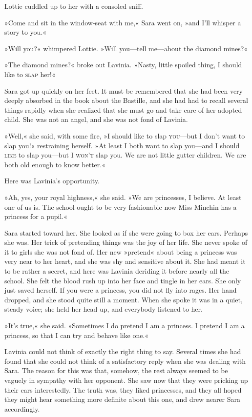 Lottie cuddled up to her with a consoled sniff.

»Come and sit in the window-seat with me,« Sara went on, »and I'll whisper a story to you.«

»Will you?« whimpered Lottie. »Will you—tell me—about the diamond mines?«

»The diamond mines?« broke out Lavinia. »Nasty, little spoiled thing, I should like to \textsc{slap} her!«

Sara got up quickly on her feet. It must be remembered that she had been very deeply absorbed in the book about the Bastille, and she had had to recall several things rapidly when she realized that she must go and take care of her adopted child. She was not an angel, and she was not fond of Lavinia.

»Well,« she said, with some fire, »I should like to slap \textsc{you}—but I don't want to slap you!« restraining herself. »At least I both want to slap you—and I should \textsc{like} to slap you—but I \textsc{won't} slap you. We are not little gutter children. We are both old enough to know better.«

Here was Lavinia's opportunity.

»Ah, yes, your royal highness,« she said. »We are princesses, I believe. At least one of us is. The school ought to be very fashionable now Miss Minchin has a princess for a pupil.«

Sara started toward her. She looked as if she were going to box her ears. Perhaps she was. Her trick of pretending things was the joy of her life. She never spoke of it to girls she was not fond of. Her new »pretend« about being a princess was very near to her heart, and she was shy and sensitive about it. She had meant it to be rather a secret, and here was Lavinia deriding it before nearly all the school. She felt the blood rush up into her face and tingle in her ears. She only just saved herself. If you were a princess, you did not fly into rages. Her hand dropped, and she stood quite still a moment. When she spoke it was in a quiet, steady voice; she held her head up, and everybody listened to her.

»It's true,« she said. »Sometimes I do pretend I am a princess. I pretend I am a princess, so that I can try and behave like one.«

Lavinia could not think of exactly the right thing to say. Several times she had found that she could not think of a satisfactory reply when she was dealing with Sara. The reason for this was that, somehow, the rest always seemed to be vaguely in sympathy with her opponent. She saw now that they were pricking up their ears interestedly. The truth was, they liked princesses, and they all hoped they might hear something more definite about this one, and drew nearer Sara accordingly.

